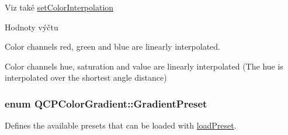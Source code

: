 \begin{DoxySeeAlso}{Viz také}
\hyperlink{classQCPColorGradient_aa13fda86406e1d896a465a409ae63b38}{set\+Color\+Interpolation} 
\end{DoxySeeAlso}
\begin{Desc}
\item[Hodnoty výčtu]\par
\begin{description}
\item[{\em 
\hypertarget{classQCPColorGradient_ac5dca17cc24336e6ca176610e7f77fc1a5e30f725c9cfe93999e268a9f92afbe7}{}ci\+R\+G\+B\label{classQCPColorGradient_ac5dca17cc24336e6ca176610e7f77fc1a5e30f725c9cfe93999e268a9f92afbe7}
}]Color channels red, green and blue are linearly interpolated. \item[{\em 
\hypertarget{classQCPColorGradient_ac5dca17cc24336e6ca176610e7f77fc1af14ae62fcae11ecc07234eeaec5856cb}{}ci\+H\+S\+V\label{classQCPColorGradient_ac5dca17cc24336e6ca176610e7f77fc1af14ae62fcae11ecc07234eeaec5856cb}
}]Color channels hue, saturation and value are linearly interpolated (The hue is interpolated over the shortest angle distance) \end{description}
\end{Desc}
\hypertarget{classQCPColorGradient_aed6569828fee337023670272910c9072}{}
\subsubsection[{Gradient\+Preset}]{\setlength{\rightskip}{0pt plus 5cm}enum {\bf Q\+C\+P\+Color\+Gradient\+::\+Gradient\+Preset}}\label{classQCPColorGradient_aed6569828fee337023670272910c9072}


Defines the available presets that can be loaded with \hyperlink{classQCPColorGradient_aa0aeec1528241728b9671bf8e60b1622}{load\+Preset}. 

